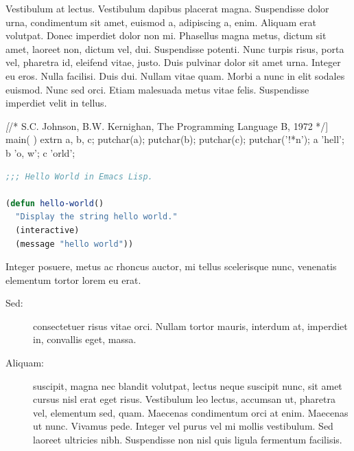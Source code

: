 \documentclass[cfonts,nofontsdir]{nostarch}
\begin{document}
Vestibulum at lectus. Vestibulum dapibus placerat magna. Suspendisse
dolor urna, condimentum sit amet, euismod a, adipiscing a, enim.
Aliquam erat volutpat. Donec imperdiet dolor non mi. Phasellus magna
metus, dictum sit amet, laoreet non, dictum vel, dui. Suspendisse
potenti. Nunc turpis risus, porta vel, pharetra id,
eleifend vitae, justo. Duis pulvinar dolor sit amet urna.
Integer eu eros. Nulla facilisi. Duis dui.  Nullam vitae
quam. Morbi a nunc in elit sodales euismod.
Nunc sed orci. Etiam malesuada metus vitae
felis. Suspendisse imperdiet velit in tellus.
\begin{quotation}
\lipsum[40-41]  
\end{quotation}
\lipsum[63-65]
\begin{Code}[commandchars=\\\[\]]
\textit[/* S.C. Johnson, B.W. Kernighan, The Programming Language B, 1972 */]
main( ) {
   extrn a, b, c;
   putchar(a); putchar(b); putchar(c); putchar('!*n');
 }
 a 'hell';
 b 'o, w';
 c 'orld';  
\end{Code}


\begin{lstlisting}[language=Lisp, frame=single, float,
  caption={[Hello, World in Emacs
  Lisp]Hello, World in Emacs Lisp%
    \index{Lisp|see{programming languages}}%
    \index{programming languages!Lisp}\index{Emacs}}] 
;;; Hello World in Emacs Lisp.

(defun hello-world()
  "Display the string hello world."
  (interactive)
  (message "hello world"))
\end{lstlisting}

Integer posuere, metus ac rhoncus auctor, mi tellus scelerisque
nunc, venenatis elementum tortor lorem eu erat.
\begin{description}
\item[Sed:] consectetuer risus vitae orci. Nullam tortor
  mauris, interdum at, imperdiet in, convallis eget, massa.
\item[Aliquam:] suscipit, magna nec blandit volutpat, lectus neque
  suscipit nunc, sit amet cursus nisl erat eget risus.
  Vestibulum leo lectus, accumsan ut, pharetra vel, elementum sed,
  quam. Maecenas condimentum orci at enim. Maecenas ut
  nunc. Vivamus pede. Integer vel purus vel mi mollis
  vestibulum. Sed laoreet ultricies nibh.  Suspendisse non nisl quis
  ligula fermentum facilisis.
\end{description}
\lipsum[37]
\end{document}
